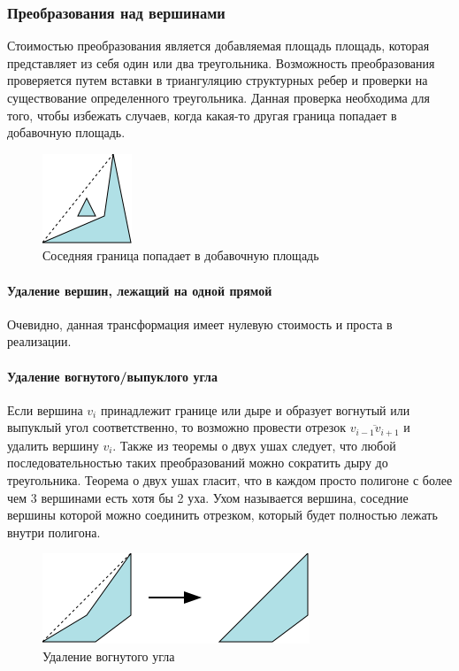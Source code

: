 \documentclass{fefu_thesis/cls/fefu}
\newcommand*\gsegment[1]{\overline{#1}}
\begin{document}
    \subsubsection{Преобразования над вершинами}
    Стоимостью преобразования является добавляемая площадь площадь, которая представляет из себя один или два треугольника. Возможность преобразования проверяется путем вставки в триангуляцию структурных ребер и проверки на существование определенного треугольника. Данная проверка необходима для того, чтобы избежать случаев, когда какая-то другая граница попадает в добавочную площадь.

    \begin{figure}[H]
        \centering
        \includegraphics[scale=1]{images/triangle_existance_check.png}
        \caption{Соседняя граница попадает в добавочную площадь}
    \end{figure}

    \paragraph{Удаление вершин, лежащий на одной прямой}
    Очевидно, данная трансформация имеет нулевую стоимость и проста в реализации.
    \paragraph{Удаление вогнутого/выпуклого угла}
    Если вершина $v_i$ принадлежит границе или дыре и образует вогнутый или выпуклый угол соответственно, то возможно провести отрезок $\gsegment{v_{i - 1}v_{i + 1}}$ и удалить вершину $v_i$. Также из теоремы о двух ушах следует, что любой последовательностью  таких преобразований можно сократить дыру до треугольника. Теорема о двух ушах гласит, что в каждом просто полигоне с более чем 3 вершинами есть хотя бы 2 уха. Ухом называется вершина, соседние вершины которой можно соединить отрезком, который будет полностью лежать внутри полигона.

    \begin{figure}[H]
        \centering
        \includegraphics[scale=1]{images/earcut.png}
        \caption{Удаление вогнутого угла}
    \end{figure}
\end{document}

